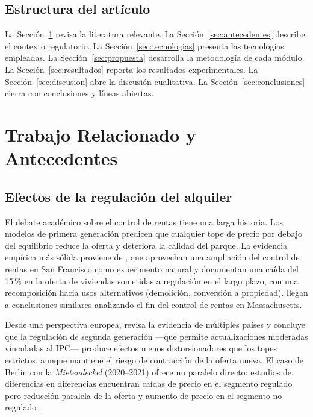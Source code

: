 \documentclass[12pt,a4paper]{article}
\begin{document}
\subsection*{Estructura del artículo}

La Sección~\ref{sec:relacionados} revisa la literatura relevante.
La Sección~\ref{sec:antecedentes} describe el contexto regulatorio.
La Sección~\ref{sec:tecnologias} presenta las tecnologías empleadas.
La Sección~\ref{sec:propuesta} desarrolla la metodología de cada módulo.
La Sección~\ref{sec:resultados} reporta los resultados experimentales.
La Sección~\ref{sec:discusion} abre la discusión cualitativa.
La Sección~\ref{sec:conclusiones} cierra con conclusiones y líneas abiertas.

\section{Trabajo Relacionado y Antecedentes}
\label{sec:relacionados}

\subsection{Efectos de la regulación del alquiler}

El debate académico sobre el control de rentas tiene una larga historia. Los modelos
de primera generación \citep{arnott1995rent} predicen que cualquier tope de precio
por debajo del equilibrio reduce la oferta y deteriora la calidad del parque. La
evidencia empírica más sólida proviene de \citet{diamond2019rent}, que aprovechan
una ampliación del control de rentas en San Francisco como experimento natural y
documentan una caída del 15\,\% en la oferta de viviendas sometidas a regulación en
el largo plazo, con una recomposición hacia usos alternativos (demolición, conversión
a propiedad). \citet{sims2007rent} llegan a conclusiones similares analizando el fin
del control de rentas en Massachusetts.

Desde una perspectiva europea, \citet{jenkins2009review} revisa la evidencia de
múltiples países y concluye que la regulación de segunda generación ---que permite
actualizaciones moderadas vinculadas al IPC--- produce efectos menos distorsionadores
que los topes estrictos, aunque mantiene el riesgo de contracción de la oferta nueva.
El caso de Berlín con la \textit{Mietendeckel} (2020--2021) ofrece un paralelo
directo: estudios de diferencias en diferencias encuentran caídas de precio en el
segmento regulado pero reducción paralela de la oferta y aumento de precio en el
segmento no regulado \citep{kholodilin2021rent}.
\end{document}
